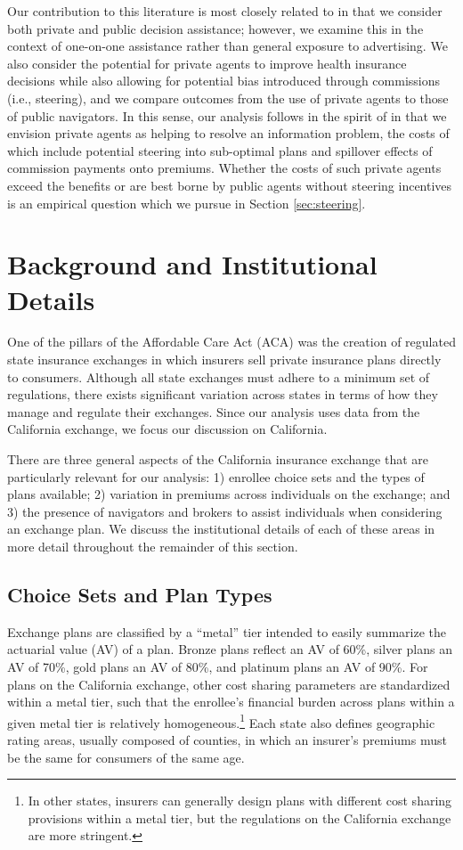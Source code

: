 \documentclass[12pt]{article}
\begin{document}
Our contribution to this literature is most closely related to \cite{aizawa2021} in that we consider both private and public decision assistance; however, we examine this in the context of one-on-one assistance rather than general exposure to advertising. We also consider the potential for private agents to improve health insurance decisions while also allowing for potential bias introduced through commissions (i.e., steering), and we compare outcomes from the use of private agents to those of public navigators. In this sense, our analysis follows in the spirit of \cite{ketcham2012} in that we envision private agents as helping to resolve an information problem, the costs of which include potential steering into sub-optimal plans and spillover effects of commission payments onto premiums. Whether the costs of such private agents exceed the benefits or are best borne by public agents without steering incentives is an empirical question which we pursue in Section \ref{sec:steering}.

\section{Background and Institutional Details}
\label{sec:background}

One of the pillars of the Affordable Care Act (ACA) was the creation of regulated state insurance exchanges in which insurers sell private insurance plans directly to consumers. Although all state exchanges must adhere to a minimum set of regulations, there exists significant variation across states in terms of how they manage and regulate their exchanges. Since our analysis uses data from the California exchange, we focus our discussion on California.

There are three general aspects of the California insurance exchange that are particularly relevant for our analysis: 1) enrollee choice sets and the types of plans available; 2) variation in premiums across individuals on the exchange; and 3) the presence of navigators and brokers to assist individuals when considering an exchange plan. We discuss the institutional details of each of these areas in more detail throughout the remainder of this section.

\subsection{Choice Sets and Plan Types}
Exchange plans are classified by a ``metal'' tier intended to easily summarize the actuarial value (AV) of a plan. Bronze plans reflect an AV of 60\%, silver plans an AV of 70\%, gold plans an AV of 80\%, and platinum plans an AV of 90\%. For plans on the California exchange, other cost sharing parameters are standardized within a metal tier, such that the enrollee's financial burden across plans within a given metal tier is relatively homogeneous.\footnote{In other states, insurers can generally design plans with different cost sharing provisions within a metal tier, but the regulations on the California exchange are more stringent.} Each state also defines geographic rating areas, usually composed of counties, in which an insurer's premiums must be the same for consumers of the same age.
\end{document}
